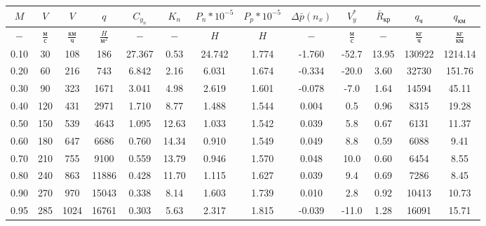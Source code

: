 \begin{tabular}{|c|c|c|c|c|c|c|c|c|c|c|c|c|}
\hline
$M$ & $V$ & $V$ & $q$ & $C_{y_n}$ & $K_n$ & $P_n*10^{-5}$ & $P_p*10^{-5}$ & $\Delta \bar{p}(n_x)$ & $V_y^*$ & $\bar{R}_{кр}$ & $q_{ч}$ & $q_{км}$ \\ 
\hline
$-$ & $\frac{м}{с}$ & $\frac{км}{ч}$ & $\frac{H}{м^2}$ & $-$ & $-$ & $H$ & $H$ & $-$ & $\frac{м}{с}$ & $-$ & $\frac{кг}{ч}$ & $\frac{кг}{км}$ \\ 
\hline
0.10 & 30 & 108 & 186 & 27.367 & 0.53 & 24.742 & 1.774 & -1.760 & -52.7 & 13.95 & 130922 & 1214.14 \\ 
\hline
0.20 & 60 & 216 & 743 & 6.842 & 2.16 & 6.031 & 1.674 & -0.334 & -20.0 & 3.60 & 32730 & 151.76 \\ 
\hline
0.30 & 90 & 323 & 1671 & 3.041 & 4.98 & 2.619 & 1.601 & -0.078 & -7.0 & 1.64 & 14594 & 45.11 \\ 
\hline
0.40 & 120 & 431 & 2971 & 1.710 & 8.77 & 1.488 & 1.544 & 0.004 & 0.5 & 0.96 & 8315 & 19.28 \\ 
\hline
0.50 & 150 & 539 & 4643 & 1.095 & 12.63 & 1.033 & 1.542 & 0.039 & 5.8 & 0.67 & 6131 & 11.37 \\ 
\hline
0.60 & 180 & 647 & 6686 & 0.760 & 14.34 & 0.910 & 1.549 & 0.049 & 8.8 & 0.59 & 6088 & 9.41 \\ 
\hline
0.70 & 210 & 755 & 9100 & 0.559 & 13.79 & 0.946 & 1.570 & 0.048 & 10.0 & 0.60 & 6454 & 8.55 \\ 
\hline
0.80 & 240 & 863 & 11886 & 0.428 & 11.70 & 1.115 & 1.627 & 0.039 & 9.4 & 0.69 & 7286 & 8.45 \\ 
\hline
0.90 & 270 & 970 & 15043 & 0.338 & 8.14 & 1.603 & 1.739 & 0.010 & 2.8 & 0.92 & 10413 & 10.73 \\ 
\hline
0.95 & 285 & 1024 & 16761 & 0.303 & 5.63 & 2.317 & 1.815 & -0.039 & -11.0 & 1.28 & 16091 & 15.71 \\ 
\hline
\end{tabular}
